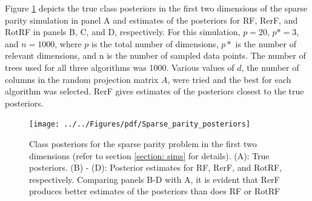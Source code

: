 \documentclass[10pt]{article}
\begin{document}
Figure \ref{posteriors} depicts the true class posteriors in the first two dimensions of the sparse parity simulation in panel A and estimates of the posteriors for RF, RerF, and RotRF in panels B, C, and D, respectively. For this simulation, $p = 20$, $p* = 3$, and $n = 1000$, where $p$ is the total number of dimensions, $p*$ is the number of relevant dimensions, and n is the number of sampled data points. The number of trees used for all three algorithms was 1000. Various values of $d$, the number of columns in the random projection matrix $A$, were tried and the best for each algorithm was selected. RerF gives estimates of the posteriors closest to the true posteriors. 

\begin{figure}[ht]
\vskip 0.2in
\begin{center}
\centerline{\texttt{[image: ../../Figures/pdf/Sparse\_parity\_posteriors]}}
\caption{Class posteriors for the sparse parity problem in the first two dimensions (refer to section \ref{section: sims} for details). (A): True posteriors. (B) - (D): Posterior estimates for RF, RerF, and RotRF, respectively. Comparing panels B-D with A, it is evident that RerF produces better estimates of the posteriors than does RF or RotRF}
\label{posteriors}
\end{center}
\vskip -0.2in
\end{figure}
\end{document}
